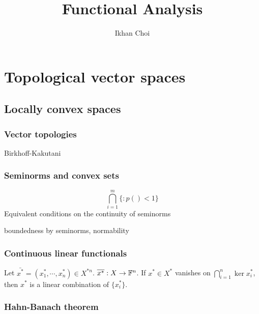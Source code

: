 \documentclass{../../large}
\begin{document}
\title{Functional Analysis}
\author{Ikhan Choi}
\maketitle
\tableofcontents

\part{Topological vector spaces}


\chapter{Locally convex spaces}
\section{Vector topologies}

\begin{prb}
\end{prb}
\begin{prb}[Metrizability]
Birkhoff-Kakutani
\end{prb}
\begin{prb}
\end{prb}




\section{Seminorms and convex sets}
\begin{prb}[Seminorms]
\[\bigcap_{i=1}^m\{:p()<1\}\]
Equivalent conditions on the continuity of seminorms
\end{prb}
\begin{pf}
\end{pf}
boundedness by seminorms, normability

\section{Continuous linear functionals}
\begin{prb}
Let $\bar{x^*}=(x_1^*,\cdots,x_n^*)\in X^{*n}$.
$\overline{x^*}:X\to\mathbb{F}^n$.
If $x^*\in X^*$ vanishes on $\bigcap_{i=1}^n\ker x_i^*$, then $x^*$ is a linear combination of $\{x_i^*\}$.
\end{prb}



\section{Hahn-Banach theorem}
\end{document}
